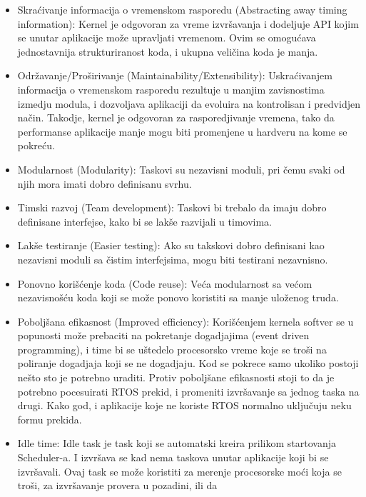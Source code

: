 \documentclass[a4paper,12pt, master]{etf}
\begin{document}
	\begin{itemize}
		\item Skra\'{c}ivanje informacija o vremenskom rasporedu (Abstracting away timing information):
		Kernel je odgovoran za vreme izvr\v{s}avanja i dodeljuje API kojim se
		unutar aplikacije mo\v{z}e upravljati vremenom. Ovim se omogu\'{c}ava jednostavnija
		strukturiranost koda, i ukupna veli\v{c}ina koda je manja.
		\item Odr\v{z}avanje/Pro\v{s}irivanje (Maintainability/Extensibility):
		Uskra\'{c}ivanjem informacija o vremenskom rasporedu rezultuje u manjim zavisnostima
		izmedju	modula, i dozvoljava aplikaciji da evoluira na kontrolisan i predvidjen
		na\v{c}in. Takodje, kernel je odgovoran za rasporedjivanje vremena, tako da performanse
		aplikacije manje mogu biti promenjene u hardveru na kome se pokre\'{c}u.
		\item Modularnost (Modularity):
		Taskovi su nezavisni moduli, pri \v{c}emu svaki od njih mora imati dobro definisanu svrhu.
		\item Timski razvoj (Team development):
		Taskovi bi trebalo da imaju dobro definisane interfejse, kako bi se lak\v{s}e razvijali u
		timovima.
		\item Lak\v{s}e testiranje (Easier testing):
		Ako su takskovi dobro definisani kao nezavisni moduli sa \v{c}istim interfejsima, mogu biti
		testirani nezavnisno.
		\item Ponovno kori\v{s}\'{c}enje koda (Code reuse):
		Ve\'{c}a modularnost sa ve\'{c}om nezavisno\v{s}\'{c}u koda koji se mo\v{z}e ponovo koristiti
		sa manje ulo\v{z}enog truda.
		\item Pobolj\v{s}ana efikasnost (Improved efficiency):
		Kori\v{s}\'{c}enjem kernela softver se u popunosti mo\v{z}e prebaciti na pokretanje dogadjajima
		(event driven programming), i time bi se u\v{s}tedelo procesorsko vreme koje se tro\v{s}i na
		poliranje dogadjaja koji se ne dogadjaju. Kod se pokrece samo ukoliko postoji ne\v{s}to
		sto je potrebno	uraditi. Protiv pobolj\v{s}ane efikasnosti stoji to da je potrebno pocesuirati
		RTOS prekid, i promeniti izvr\v{s}avanje sa jednog taska na drugi. Kako god, i aplikacije koje ne
		koriste RTOS normalno uklju\v{c}uju neku formu prekida.
		\item Idle time:
		Idle task je task koji se automatski kreira prilikom startovanja Scheduler-a. I izvr\v{s}ava se
		kad nema taskova unutar aplikacije koji bi se izvr\v{s}avali. Ovaj task se mo\v{z}e koristiti za
		merenje procesorske mo\'{c}i koja se tro\v{s}i, za izvr\v{s}avanje provera u pozadini, ili da

\end{itemize}
\end{document}
